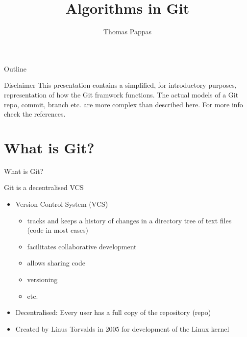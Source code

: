 \documentclass{beamer}
\begin{document}
\title{Algorithms in Git}
\author{Thomas Pappas}
\maketitle

\begin{frame}{Outline}
  \tableofcontents
\end{frame}

\begin{frame}
  \begin{block}{Disclaimer}
    This presentation contains a simplified, for introductory purposes, representation of how the Git framwork functions.
    The actual models of a Git repo, commit, branch etc. are more complex than described here.
    For more info check the references.
  \end{block}
\end{frame}

\section{What is Git?}

\begin{frame}{What is Git?}
  \begin{block}{Git is a decentralised VCS}
    \begin{itemize}
    \item Version Control System (VCS)
      \begin{itemize}
        \item tracks and keeps a history of changes in a directory tree of text files\\(code in most cases)
        \item facilitates collaborative development
        \item allows sharing code
        \item versioning
        \item etc.
      \end{itemize}
    \item Decentralised: Every user has a full copy of the repository (repo)
    \item Created by Linus Torvalds in 2005 for development of the Linux kernel
  \end{itemize}
  \end{block}
\end{frame}
\end{document}
